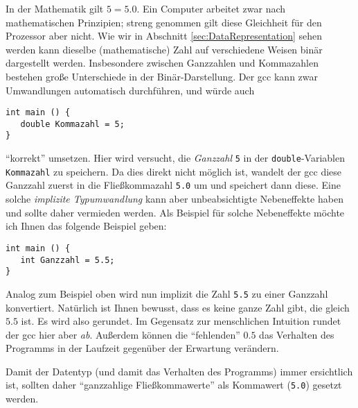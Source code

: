 \begin{hintbox}
In der Mathematik gilt $5 = 5.0$. Ein Computer arbeitet zwar nach mathematischen Prinzipien; streng genommen gilt diese Gleichheit für den Prozessor aber nicht. Wie wir in Abschnitt \ref{sec:DataRepresentation} sehen werden kann dieselbe (mathematische) Zahl auf verschiedene Weisen binär dargestellt werden. Insbesondere zwischen Ganzzahlen und Kommazahlen bestehen große Unterschiede in der Binär-Darstellung. Der gcc kann zwar Umwandlungen automatisch durchführen, und würde auch
\begin{codebox}
\begin{verbatim}
int main () {
   double Kommazahl = 5;
}
\end{verbatim}
\end{codebox}
\enquote{korrekt} umsetzen. Hier wird versucht, die \emph{Ganzzahl} \texttt{5} in der \texttt{double}-Variablen \texttt{Kommazahl} zu speichern. Da dies direkt nicht möglich ist, wandelt der gcc diese Ganzzahl zuerst in die Fließkommazahl \texttt{5.0} um und speichert dann diese. Eine solche \emph{implizite Typumwandlung} kann aber unbeabsichtigte Nebeneffekte haben und sollte daher vermieden werden. Als Beispiel für solche Nebeneffekte möchte ich Ihnen das folgende Beispiel geben:
\end{hintbox}
%
\begin{hintbox}[]
\begin{codebox}
\begin{verbatim}
int main () {
   int Ganzzahl = 5.5;
}
\end{verbatim}
\end{codebox}
Analog zum Beispiel oben wird nun implizit die Zahl \texttt{5.5} zu einer Ganzzahl konvertiert. Natürlich ist Ihnen bewusst, dass es keine ganze Zahl gibt, die gleich $5.5$ ist. Es wird also gerundet. Im Gegensatz zur menschlichen Intuition rundet der gcc hier aber \emph{ab}. Außerdem können die \enquote{fehlenden} $0.5$ das Verhalten des Programms in der Laufzeit gegenüber der Erwartung verändern.

Damit der Datentyp (und damit das Verhalten des Programms) immer ersichtlich ist, sollten daher \enquote{ganzzahlige Fließkommawerte} als Kommawert (\eg \texttt{5.0}) gesetzt werden.
\end{hintbox}

